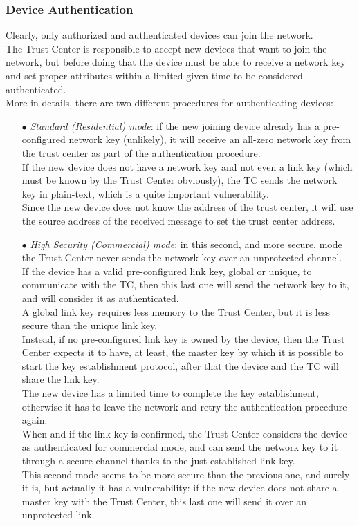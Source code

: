 \documentclass[12pt]{report}
\begin{document}
\subsubsection{Device Authentication}
\bigskip
Clearly, only authorized and authenticated devices can join the network.\\
The Trust Center is responsible to accept new devices that want to join the network, but before doing that the device must be able to receive a network key and set proper attributes within a limited given time to be considered authenticated.\\
More in details, there are two different procedures for authenticating devices:

\begin{itemize}
\setlength{\itemindent}{+4mm}
\item[$\bullet$] \emph{Standard (Residential) mode}: if the new joining device already has a pre-configured network key (unlikely), it will receive an all-zero network key from the trust center as part of the authentication procedure.\\
If the new device does not have a network key and not even a link key (which must be known by the Trust Center obviously), the TC  sends the network key in plain-text, which is a quite important vulnerability.\\
Since the new device does not know the address of the trust center, it will use the source address of the received message to set the trust center address.

\item[$\bullet$] \emph{High Security (Commercial) mode}: in this second, and more secure, mode the Trust Center never sends the network key over an unprotected channel.\\
If the device has a valid pre-configured link key, global or unique, to communicate with the TC, then this last one will send the network key to it, and will consider it as authenticated.\\
A global link key requires less memory to the Trust Center, but it is less secure than the unique link key.\\
Instead, if no pre-configured link key is owned by the device, then the Trust Center expects it to have, at least, the master key by which it is possible to start the key establishment protocol, after that the device and the TC will share the link key.\\
The new device has a limited time to complete the key establishment, otherwise it has to leave the network and retry the authentication procedure again.\\
When and if the link key is confirmed, the Trust Center considers the device as authenticated for commercial mode, and can send the network key to it through a secure channel thanks to the just established link key.\\

This second mode seems to be more secure than the previous one, and surely it is, but actually it has a vulnerability: if the new device does not share a master key with the Trust Center, this last one will send it over an unprotected link. 

\end{itemize}
\end{document}
